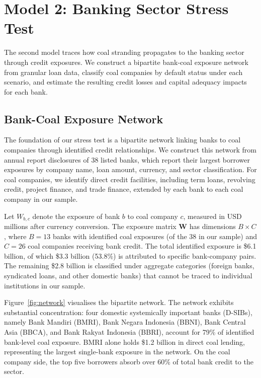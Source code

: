 
\section{Model 2: Banking Sector Stress Test}
\label{sec:model2}

The second model traces how coal stranding propagates to the banking sector through credit exposures. We construct a bipartite bank-coal exposure network from granular loan data, classify coal companies by default status under each scenario, and estimate the resulting credit losses and capital adequacy impacts for each bank.

\subsection{Bank-Coal Exposure Network}
\label{subsec:bipartite_network}

The foundation of our stress test is a bipartite network linking banks to coal companies through identified credit relationships. We construct this network from annual report disclosures of 38 listed banks, which report their largest borrower exposures by company name, loan amount, currency, and sector classification. For coal companies, we identify direct credit facilities, including term loans, revolving credit, project finance, and trade finance, extended by each bank to each coal company in our sample.

Let $W_{b,c}$ denote the exposure of bank $b$ to coal company $c$, measured in USD millions after currency conversion. The exposure matrix $\mathbf{W}$ has dimensions $B \times C$, where $B = 13$ banks with identified coal exposures (of the 38 in our sample) and $C = 26$ coal companies receiving bank credit. The total identified exposure is \$6.1 billion, of which \$3.3 billion (53.8\%) is attributed to specific bank-company pairs. The remaining \$2.8 billion is classified under aggregate categories (foreign banks, syndicated loans, and other domestic banks) that cannot be traced to individual institutions in our sample.

Figure~\ref{fig:network} visualises the bipartite network. The network exhibits substantial concentration: four domestic systemically important banks (D-SIBs), namely Bank Mandiri (BMRI), Bank Negara Indonesia (BBNI), Bank Central Asia (BBCA), and Bank Rakyat Indonesia (BBRI), account for 79\% of identified bank-level coal exposure. BMRI alone holds \$1.2 billion in direct coal lending, representing the largest single-bank exposure in the network. On the coal company side, the top five borrowers absorb over 60\% of total bank credit to the sector.

